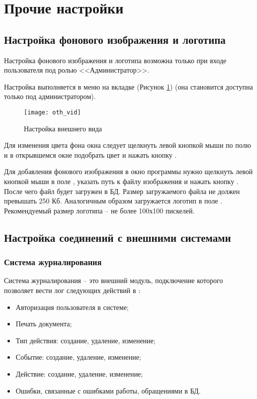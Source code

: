 \newpage
\section{Прочие настройки}

\subsection{Настройка фонового изображения и логотипа}

Настройка фонового изображения и логотипа возможна только при входе пользователя под ролью <<Администратор>>.

Настройка выполняется в меню  на вкладке  (Рисунок \ref{img_oth_vid}) (она становится доступна только под администратором).

\begin{figure}[ht]\centering
 \texttt{[image: oth\_vid]}
 \caption{Настройка внешнего вида}
 \label{img_oth_vid}
\end{figure}

Для изменения цвета фона окна следует щелкнуть левой кнопкой мыши по полю  и в открывшемся окне подобрать цвет и нажать кнопку .

Для добавления фонового изображения в окно программы нужно щелкнуть левой кнопкой мыши в поле , указать путь к файлу изображения и нажать кнопку  . После чего файл будет загружен в БД. Размер загружаемого файла не должен превышать 250 Кб. Аналогичным образом загружается логотип в поле . Рекомендуемый размер логотипа – не более 100х100 пискелей.

\subsection{Настройка соединений с внешними системами}

\subsubsection{Система журналирования}

Система журналирования – это внешний модуль, подключение которого позволяет вести лог следующих действий в \tmis:
\begin{itemize}
 \item Авторизация пользователя в системе;
 \item Печать документа;
 \item Тип действия: создание, удаление, изменение;
 \item Событие: создание, удаление, изменение;
 \item Действие: создание, удаление, изменение;
 \item Ошибки, связанные с ошибками работы, обращениями в БД.
\end{itemize}
 

